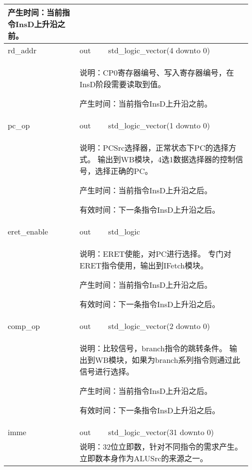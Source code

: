 \begin{tabularx}{\textwidth}{lll}
{                产生时间：当前指令InsD上升沿之前。
            } \\
            \midrule
            rd\_addr        & out       & std\_logic\_vector(4 downto 0) \\
            \cmidrule(l){2-3}
            &
            \multicolumn{2}{X}{
                说明：CP0寄存器编号、写入寄存器编号，在InsD阶段需要读取到值。

                产生时间：当前指令InsD上升沿之前。
            } \\
            \midrule
            pc\_op          & out       & std\_logic\_vector(1 downto 0) \\
            \cmidrule(l){2-3}
            &
            \multicolumn{2}{X}{
                说明：PCSrc选择器，正常状态下PC的选择方式。%
                输出到WB模块，4选1数据选择器的控制信号，选择正确的PC。

                产生时间：当前指令InsD上升沿之后。

                有效时间：下一条指令InsD上升沿之后。 
            } \\
            \midrule
            eret\_enable    & out       & std\_logic \\

            \cmidrule(l){2-3}
            &
            \multicolumn{2}{X}{
                说明：ERET使能，对PC进行选择。%
                专门对ERET指令使用，输出到IFetch模块。

                产生时间：当前指令InsD上升沿之后。

                有效时间：下一条指令InsD上升沿之后。 
            } \\
            \midrule
            comp\_op        & out       & std\_logic\_vector(2 downto 0) \\
            \cmidrule(l){2-3}
            &
            \multicolumn{2}{X}{
                说明：比较信号，branch指令的跳转条件。%
                输出到WB模块，如果为branch系列指令则通过此信号进行选择。

                产生时间：当前指令InsD上升沿之后。

                有效时间：下一条指令InsD上升沿之后。 
            } \\
            \midrule
            imme            & out       & std\_logic\_vector(31 downto 0) \\
            \cmidrule(l){2-3}
            &
            \multicolumn{2}{X}{
                说明：32位立即数，针对不同指令的需求产生。%
                立即数本身作为ALUSrc的来源之一。

}
\end{tabularx}
